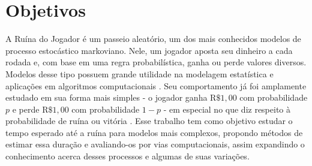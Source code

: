 \documentclass[a4paper,10pt,twocolumn]{article}
\begin{document}
\pagestyle{fancy}
\fancyhead{}
\renewcommand{\headrulewidth}{0pt}


\section{Objetivos}

A Ruína do Jogador é um passeio aleatório, um dos mais conhecidos modelos de
processo estocástico markoviano. Nele, um jogador aposta seu dinheiro a cada
rodada e, com base em uma regra probabilística, ganha ou perde valores diversos.
Modelos desse tipo possuem grande utilidade na modelagem estatística e
aplicações em algoritmos computacionais \cite{ross_markov_2019}. Seu
comportamento já foi amplamente estudado em sua forma mais simples - o jogador
ganha $\mathrm{R}\$1,00$ com probabilidade $p$ e perde $\mathrm{R}\$1,00$ com
probabilidade $1-p$ - em especial no que diz respeito à probabilidade de ruína
ou vitória \cite{ross_introduction_2019}. Esse trabalho tem como objetivo
estudar o tempo esperado até a ruína para modelos mais complexos, propondo
métodos de estimar essa duração e avaliando-os por vias computacionais, assim
expandindo o conhecimento acerca desses processos e algumas de suas variações.
\end{document}
